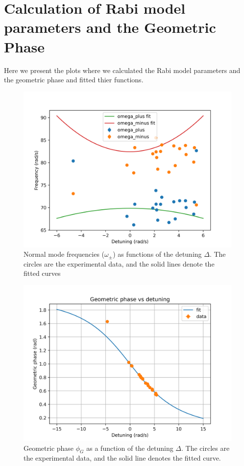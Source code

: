 \section{Calculation of Rabi model parameters and the Geometric Phase}
Here we present the plots where we calculated the Rabi model parameters and the geometric phase and fitted thier functions.

\begin{figure}[H]
	\centering
	\includegraphics[scale=0.4]{20_freq_det.png}
	\caption{ Normal mode frequencies ($ \omega_{\pm} $) as functions of the detuning $ \Delta $. The circles are
		the experimental data, and the solid lines denote the fitted curves}
	\label{fig:first_sq}
\end{figure}

\begin{figure}[H]
	\centering
	\includegraphics[scale=0.4]{Geometric_phase.png}
	\caption{Geometric phase $ \phi_{G} $ as a function of the detuning $ \Delta $. The circles are the
		experimental data, and the solid line denotes the fitted curve. }
	\label{fig:first_sq}
\end{figure}

